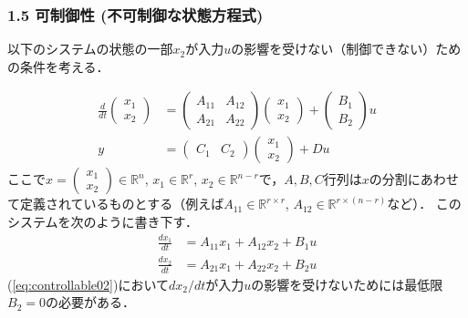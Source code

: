 \documentclass[10pt]{beamer}
\begin{document}
\begin{frame}[t]
\frametitle{1.5 可制御性 (不可制御な状態方程式)}

以下のシステムの状態の一部$x_2$が入力$u$の影響を受けない（制御できない）ための条件を考える．

\begin{align}
 \frac{d}{dt}
  \left(\begin{array}{c}
         {x}_1 \\
	 {x}_2
	\end{array}\right)
  &=
  \left(\begin{array}{cc}
         {A}_{11} & {A}_{12} \\
	     {A}_{21} & {A}_{22}
	\end{array}\right)
  \left(\begin{array}{c}
         {x}_1 \\
	 {x}_2
	\end{array}\right)
  +
  \left(\begin{array}{c}
         {B}_1 \\
	 {B}_2
	\end{array}\right)
  u \\
 y &=
  \left(\begin{array}{cc}
         {C}_1 & {C}_2
	\end{array}\right)
  \left(\begin{array}{c}
         {x}_1 \\
	 {x}_2
	\end{array}\right)
  + D u
\end{align}
ここで$x = \left(\begin{array}{c} {x}_1 \\ {x}_2 \end{array}\right) \in {\mathbb R}^n$,
$x_1 \in {\mathbb R}^r$, $x_2 \in {\mathbb R}^{n-r}$で，$A,B,C$行列は$x$の分割にあわせて定義されているものとする（例えば$A_{11} \in {\mathbb R}^{r \times r}$, $A_{12} \in {\mathbb R}^{r \times (n-r)}$など）．
このシステムを次のように書き下す．
\begin{align}
 \frac{dx_1}{dt} &= A_{11} x_1 + A_{12} x_2 + B_1 u
 \\
 \frac{dx_2}{dt} &= A_{21} x_1 + A_{22} x_2 + B_2 u

\end{align}
(\ref{eq:controllable02})において$dx_2/dt$が入力$u$の影響を受けないためには最低限$B_2=0$の必要がある．
\end{frame}
\end{document}
